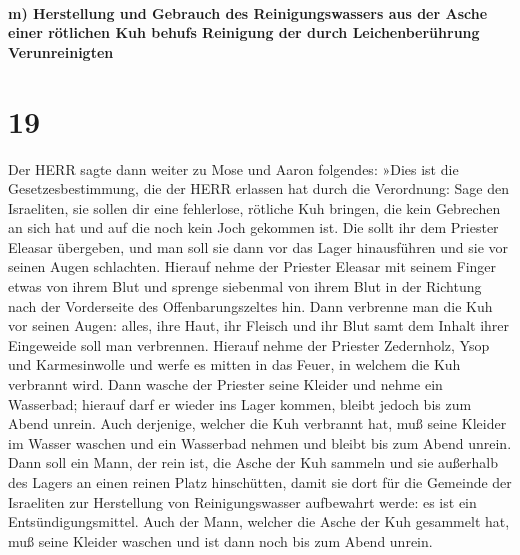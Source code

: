 \hypertarget{m-herstellung-und-gebrauch-des-reinigungswassers-aus-der-asche-einer-ruxf6tlichen-kuh-behufs-reinigung-der-durch-leichenberuxfchrung-verunreinigten}{%
\paragraph{m) Herstellung und Gebrauch des Reinigungswassers aus der
Asche einer rötlichen Kuh behufs Reinigung der durch Leichenberührung
Verunreinigten}\label{m-herstellung-und-gebrauch-des-reinigungswassers-aus-der-asche-einer-ruxf6tlichen-kuh-behufs-reinigung-der-durch-leichenberuxfchrung-verunreinigten}}

\hypertarget{section-18}{%
\section{19}\label{section-18}}

Der HERR sagte dann weiter zu Mose und Aaron folgendes:
»Dies ist die Gesetzesbestimmung, die der HERR erlassen
hat durch die Verordnung: Sage den Israeliten, sie sollen dir eine
fehlerlose, rötliche Kuh bringen, die kein Gebrechen an sich hat und auf
die noch kein Joch gekommen ist. Die sollt ihr dem
Priester Eleasar übergeben, und man soll sie dann vor das Lager
hinausführen und sie vor seinen Augen schlachten. Hierauf
nehme der Priester Eleasar mit seinem Finger etwas von ihrem Blut und
sprenge siebenmal von ihrem Blut in der Richtung nach der Vorderseite
des Offenbarungszeltes hin. Dann verbrenne man die Kuh vor
seinen Augen: alles, ihre Haut, ihr Fleisch und ihr Blut samt dem Inhalt
ihrer Eingeweide soll man verbrennen. Hierauf nehme der
Priester Zedernholz, Ysop und Karmesinwolle und werfe es mitten in das
Feuer, in welchem die Kuh verbrannt wird. Dann wasche der
Priester seine Kleider und nehme ein Wasserbad; hierauf darf er wieder
ins Lager kommen, bleibt jedoch bis zum Abend unrein. Auch
derjenige, welcher die Kuh verbrannt hat, muß seine Kleider im Wasser
waschen und ein Wasserbad nehmen und bleibt bis zum Abend unrein.
Dann soll ein Mann, der rein ist, die Asche der Kuh
sammeln und sie außerhalb des Lagers an einen reinen Platz hinschütten,
damit sie dort für die Gemeinde der Israeliten zur Herstellung von
Reinigungswasser aufbewahrt werde: es ist ein Entsündigungsmittel.
Auch der Mann, welcher die Asche der Kuh gesammelt hat,
muß seine Kleider waschen und ist dann noch bis zum Abend unrein.

